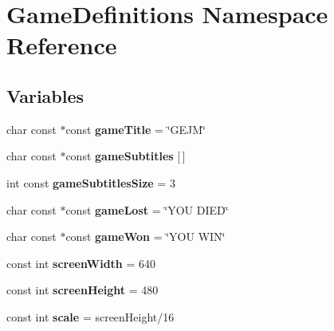 \hypertarget{namespace_game_definitions}{}\section{Game\+Definitions Namespace Reference}
\label{namespace_game_definitions}
\subsection*{Variables}
\begin{DoxyCompactItemize}
\item 
char const $\ast$const {\bfseries game\+Title} = \char`\"{}G\+E\+JM\char`\"{}\hypertarget{namespace_game_definitions_aeec8845c8639915e90f7c8497b95f6d1}{}\label{namespace_game_definitions_aeec8845c8639915e90f7c8497b95f6d1}

\item 
char const $\ast$const {\bfseries game\+Subtitles} \mbox{[}$\,$\mbox{]}
\item 
int const {\bfseries game\+Subtitles\+Size} = 3\hypertarget{namespace_game_definitions_a7c44ae1f2c23a495466621e57bb86454}{}\label{namespace_game_definitions_a7c44ae1f2c23a495466621e57bb86454}

\item 
char const $\ast$const {\bfseries game\+Lost} = \char`\"{}Y\+OU D\+I\+ED\char`\"{}\hypertarget{namespace_game_definitions_afb3c26bc8f50dbd4fbf3f317b98b24ba}{}\label{namespace_game_definitions_afb3c26bc8f50dbd4fbf3f317b98b24ba}

\item 
char const $\ast$const {\bfseries game\+Won} = \char`\"{}Y\+OU W\+IN\char`\"{}\hypertarget{namespace_game_definitions_aeb1c98d4460923919f469103863ca05b}{}\label{namespace_game_definitions_aeb1c98d4460923919f469103863ca05b}

\item 
const int {\bfseries screen\+Width} = 640\hypertarget{namespace_game_definitions_add24d924ce178f71338fb6829f91c1ba}{}\label{namespace_game_definitions_add24d924ce178f71338fb6829f91c1ba}

\item 
const int {\bfseries screen\+Height} = 480\hypertarget{namespace_game_definitions_a73d8b9cef4b5a1b48f81e20847ba281a}{}\label{namespace_game_definitions_a73d8b9cef4b5a1b48f81e20847ba281a}

\item 
const int {\bfseries scale} = screen\+Height/16\hypertarget{namespace_game_definitions_a35be687342b775d3ecb8f901f935d39d}{}\label{namespace_game_definitions_a35be687342b775d3ecb8f901f935d39d}

\end{DoxyCompactItemize}


